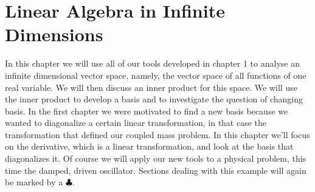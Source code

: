 \chapter{Linear Algebra in Infinite Dimensions}
In this chapter we will use all of our tools developed in chapter 1 to analyse an infinite dimensional vector space, namely, the vector space of all functions of one real variable. We will then discuss an inner product for this space.  We will use the inner product to develop a basis and to investigate the question of changing basis. In the first chapter we were motivated to find a new basis because we wanted to diagonalize a certain linear transformation, in that case the transformation that defined our coupled mass problem. In this chapter we'll focus on the derivative, which is a linear transformation, and look at the basis that diagonalizes it. Of course we will apply our new tools to a physical problem, this time the damped, driven oscillator.  Sections dealing with this example will again be marked by a $\clubsuit$.




